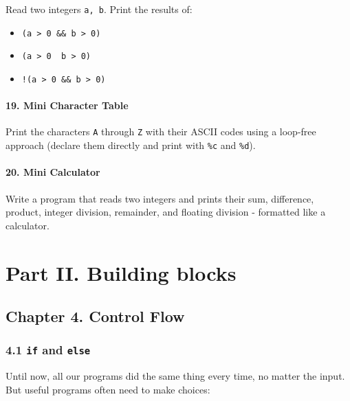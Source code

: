 \documentclass[
  letterpaper,
  DIV=11,
  numbers=noendperiod]{scrreprt}
\providecommand{\tightlist}{%
  \setlength{\itemsep}{0pt}\setlength{\parskip}{0pt}}
\begin{document}
Read two integers \texttt{a,\ b}. Print the results of:

\begin{itemize}
\tightlist
\item
  \texttt{(a\ \textgreater{}\ 0\ \&\&\ b\ \textgreater{}\ 0)}
\item
  \texttt{(a\ \textgreater{}\ 0\ \textbar{}\textbar{}\ b\ \textgreater{}\ 0)}
\item
  \texttt{!(a\ \textgreater{}\ 0\ \&\&\ b\ \textgreater{}\ 0)}
\end{itemize}

\subsubsection{19. Mini Character Table}\label{mini-character-table}

Print the characters \texttt{\textquotesingle{}A\textquotesingle{}}
through \texttt{\textquotesingle{}Z\textquotesingle{}} with their ASCII
codes using a loop-free approach (declare them directly and print with
\texttt{\%c} and \texttt{\%d}).

\subsubsection{20. Mini Calculator}\label{mini-calculator}

Write a program that reads two integers and prints their sum,
difference, product, integer division, remainder, and floating division
- formatted like a calculator.


\chapter{Part II. Building blocks}\label{part-ii.-building-blocks}

\section{Chapter 4. Control Flow}\label{chapter-4.-control-flow}

\subsection{\texorpdfstring{4.1 \texttt{if} and
\texttt{else}}{4.1 if and else}}\label{if-and-else}

Until now, all our programs did the same thing every time, no matter the
input. But useful programs often need to make choices:
\end{document}
